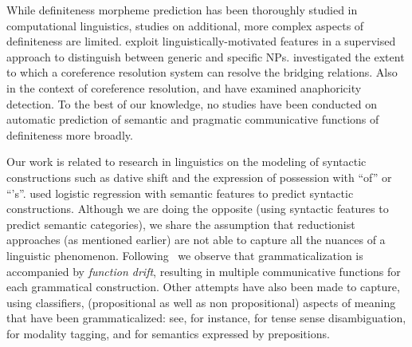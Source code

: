 \documentclass[11pt,letterpaper]{article}
\newcommand{\ensuretext}[1]{#1}
\newcommand{\nssmarker}{\ensuretext{\textcolor{magenta}{\ensuremath{^{\textsc{NS}}_{\textsc{S}}}}}}
\newcommand{\abmarker}{\ensuretext{\textcolor{red}{\ensuremath{^{\textsc{A}}_{\textsc{B}}}}}}
\newcommand{\arkcomment}[3]{\ensuretext{\textcolor{#3}{[#1 #2]}}}
\newcommand{\nss}[1]{\arkcomment{\nssmarker}{#1}{magenta}}
\newcommand{\ab}[1]{\arkcomment{\abmarker}{#1}{red}}
\begin{document}
While definiteness morpheme prediction has been thoroughly studied in computational linguistics, 
studies on additional, more complex aspects of definiteness are limited.  
\citet{reiter10}  exploit linguistically-motivated features in a supervised approach to 
distinguish between generic and specific NPs.  investigated the extent to which a coreference resolution system can resolve the bridging relations.  
Also in the context of coreference resolution, \citet{ng-02} and \citet{kong-10} have examined anaphoricity detection.
To the best of our knowledge, no studies have been conducted 
on automatic prediction of semantic and pragmatic communicative functions of definiteness more broadly. 



Our work is related to research in linguistics on the modeling of syntactic constructions 
such as dative shift and the expression of possession with ``of'' or ``'s''.  
\citet{bresnan10} used logistic regression with semantic features to predict syntactic constructions.   
Although we are doing the opposite (using syntactic features to predict semantic categories), 
we share the assumption that reductionist approaches (as mentioned earlier) are not able to capture all the nuances of a linguistic phenomenon. 
Following~\citet{hopper-03} we observe that grammaticalization is accompanied by {\em function drift}, 
resulting in multiple communicative functions for each grammatical construction. 
Other attempts have also been made to capture,  using classifiers, (propositional as well as non propositional) aspects of meaning that have been grammaticalized: see, for instance, \cite{reichart10} for tense sense disambiguation, \cite{prabhakaran12} for modality tagging, and \cite{srikumar13} for semantics expressed by prepositions. 
\end{document}
